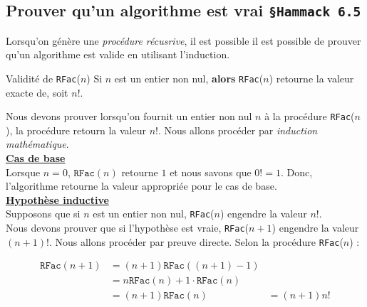 \documentclass[16pt]{report}
\begin{document}
\begin{multicols*}{2}
        \section{Prouver qu'un algorithme est vrai \texttt{\small{\S Hammack 6.5}}}
            Lorsqu'on génère une \textit{procédure récusrive}, il est possible il est possible de prouver qu'un 
            algorithme est valide en utilisant l'induction. 

            \begin{prop}{Validité de \texttt{RFac}($n$)}{}
                Si $n$ est un entier non nul, \textbf{alors} \texttt{RFac}($n$) retourne la valeur exacte 
                de, soit $n!$. 
            \end{prop}

            \begin{Preuve}{}{}
                Nous devons prouver lorsqu'on fournit un entier non nul $n$ à la procédure \texttt{RFac}($n$), 
                la procédure retourn la valeur $n!$. Nous allons procéder par \textit{induction mathématique}.  
                \vspace{1em}\\
                \underline{\textbf{Cas de base}}
                \vspace{1em}\\
                Lorsque $n = 0$, $\texttt{RFac}(n)$ retourne $1$ et nous savons que $0! = 1$. Donc, 
                l'algorithme retourne la valeur appropriée pour le cas de base. 
                \vspace{1em}\\ 
                \underline{\textbf{Hypothèse inductive}} 
                \vspace{1em}\\ 
                Supposons que si $n$ est un entier non nul, \texttt{RFac}($n$) engendre la valeur $n!$. 
                \vspace{1em}\\
                Nous devons prouver que si l'hypothèse est vraie, \texttt{RFac}($n + 1$) engendre 
                la valeur $(n+1)!$. Nous allons procéder par preuve directe. 
                Selon la procédure \texttt{RFac}($n$) : 

                \begin{align*}
                        \texttt{RFac}(n + 1) &= (n + 1)\texttt{RFac}((n + 1) - 1) \\
                                      &= n \texttt{RFac}(n) + 1 \cdot \texttt{RFac}(n) \\ 
                                      &= (n+1)\texttt{RFac}(n)
                                      &= (n+1)n! 
                \end{align*}


\end{Preuve}
\end{multicols*}
\end{document}
